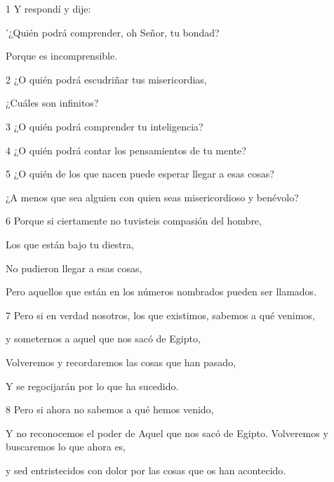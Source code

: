 \par 1 Y respondí y dije:

\par '¿Quién podrá comprender, oh Señor, tu bondad?

\par Porque es incomprensible.

\par 2 ¿O quién podrá escudriñar tus misericordias,

\par ¿Cuáles son infinitos?

\par 3 ¿O quién podrá comprender tu inteligencia?

\par 4 ¿O quién podrá contar los pensamientos de tu mente?

\par 5 ¿O quién de los que nacen puede esperar llegar a esas cosas?

\par ¿A menos que sea alguien con quien seas misericordioso y benévolo?

\par 6 Porque si ciertamente no tuvisteis compasión del hombre,

\par Los que están bajo tu diestra,

\par No pudieron llegar a esas cosas,

\par Pero aquellos que están en los números nombrados pueden ser llamados.

\par 7 Pero si en verdad nosotros, los que existimos, sabemos a qué venimos,

\par y someternos a aquel que nos sacó de Egipto,

\par Volveremos y recordaremos las cosas que han pasado,

\par Y se regocijarán por lo que ha sucedido.

\par 8 Pero si ahora no sabemos a qué hemos venido,

\par Y no reconocemos el poder de Aquel que nos sacó de Egipto. Volveremos y buscaremos lo que ahora es,

\par y sed entristecidos con dolor por las cosas que os han acontecido.

